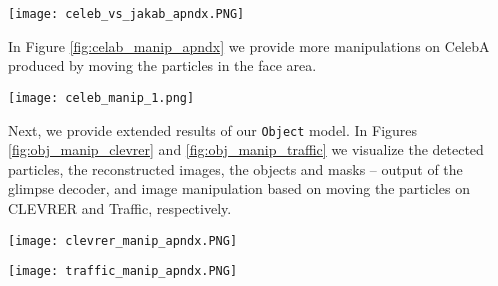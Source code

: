 \documentclass[nohyperref]{article}
\theoremstyle{plain}
\theoremstyle{definition}
\theoremstyle{remark}
\begin{document}
\begin{figure*}
     \centering
     \texttt{[image: celeb\_vs\_jakab\_apndx.PNG]}
        \caption{Image manipulation comparison with KeyNet~\citep{jakab2018unsupervised}. We visualize the keypoints learned by each model, the reconstruction, and the effect that moving keypoints on the nose and the mouth has on the output image.}
        \label{fig:vs_jakab_apndx}
\end{figure*}

In Figure \ref{fig:celab_manip_apndx} we provide more manipulations on CelebA produced by moving the particles in the face area.

\begin{figure*}
     \centering
     \texttt{[image: celeb\_manip\_1.png]}
        \caption{Image manipulation comparison with KeyNet~\citep{jakab2018unsupervised}. We visualize the effect of moving keypoints in the face area.}
        \label{fig:celab_manip_apndx}
\end{figure*}


Next, we provide extended results of our \texttt{Object} model. In Figures \ref{fig:obj_manip_clevrer} and \ref{fig:obj_manip_traffic} we visualize the detected particles, the reconstructed images, the objects and masks -- output of the glimpse decoder, and image manipulation based on moving the particles on CLEVRER and Traffic, respectively.


\begin{figure*}
     \centering
     \texttt{[image: clevrer\_manip\_apndx.PNG]}
        \caption{Scene decomposition and manipulation with \texttt{Object} model on CLEVRER. We show the detected particles, the reconstructed images, the objects and masks -- output of the glimpse decoder, and image manipulation based on moving the particles.}
        \label{fig:obj_manip_clevrer}
\end{figure*}

\begin{figure*}
     \centering
     \texttt{[image: traffic\_manip\_apndx.PNG]}
        \caption{Scene decomposition and manipulation with \texttt{Object} model on Traffic. We show the detected particles, the reconstructed images, the objects and masks -- output of the glimpse decoder, and image manipulation based on moving the particles.}
        \label{fig:obj_manip_traffic}
\end{figure*}
\end{document}
